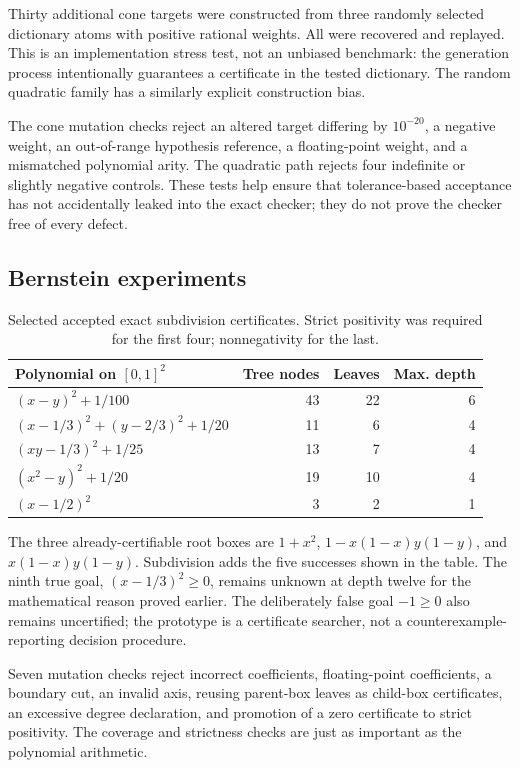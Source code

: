 \documentclass[11pt,letterpaper]{article}
\theoremstyle{definition}
\theoremstyle{remark}
\begin{document}
Thirty additional cone targets were constructed from three randomly selected dictionary atoms with positive rational weights. All were recovered and replayed. This is an implementation stress test, not an unbiased benchmark: the generation process intentionally guarantees a certificate in the tested dictionary. The random quadratic family has a similarly explicit construction bias.

The cone mutation checks reject an altered target differing by $10^{-20}$, a negative weight, an out-of-range hypothesis reference, a floating-point weight, and a mismatched polynomial arity. The quadratic path rejects four indefinite or slightly negative controls. These tests help ensure that tolerance-based acceptance has not accidentally leaked into the exact checker; they do not prove the checker free of every defect.

\subsection{Bernstein experiments}
\begin{table}[htbp]
\centering\small
\begin{tabularx}{\textwidth}{@{}Yrrr@{}}
\toprule
Polynomial on $[0,1]^2$ & Tree nodes & Leaves & Max. depth \\
\midrule
$(x-y)^2+1/100$ & 43 & 22 & 6 \\
$(x-1/3)^2+(y-2/3)^2+1/20$ & 11 & 6 & 4 \\
$(xy-1/3)^2+1/25$ & 13 & 7 & 4 \\
$(x^2-y)^2+1/20$ & 19 & 10 & 4 \\
$(x-1/2)^2$ & 3 & 2 & 1 \\
\bottomrule
\end{tabularx}
\caption{Selected accepted exact subdivision certificates. Strict positivity was required for the first four; nonnegativity for the last.}
\end{table}
The three already-certifiable root boxes are $1+x^2$, $1-x(1-x)y(1-y)$, and $x(1-x)y(1-y)$. Subdivision adds the five successes shown in the table. The ninth true goal, $(x-1/3)^2\geq0$, remains unknown at depth twelve for the mathematical reason proved earlier. The deliberately false goal $-1\geq0$ also remains uncertified; the prototype is a certificate searcher, not a counterexample-reporting decision procedure.

Seven mutation checks reject incorrect coefficients, floating-point coefficients, a boundary cut, an invalid axis, reusing parent-box leaves as child-box certificates, an excessive degree declaration, and promotion of a zero certificate to strict positivity. The coverage and strictness checks are just as important as the polynomial arithmetic.
\end{document}
